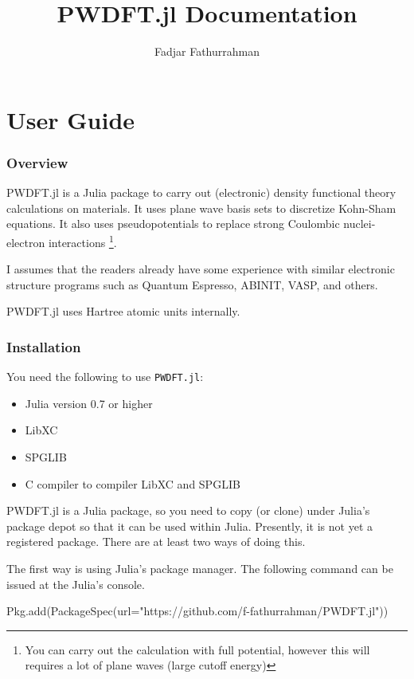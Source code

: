 \documentclass[a4paper,10pt]{paper}
\begin{document}
\title{\textsf{PWDFT.jl} Documentation}
\author{Fadjar Fathurrahman}
\maketitle

\tableofcontents

\part{User Guide}

\section{Overview}

\textsf{PWDFT.jl} is a Julia package to carry out (electronic)
density functional theory calculations on materials.
It uses plane wave basis sets to discretize Kohn-Sham equations.
It also uses pseudopotentials to replace strong Coulombic nuclei-electron
interactions \footnote{You can carry out the calculation with
full potential, however this will requires a lot of plane waves (large
cutoff energy)}.

I assumes that the readers already have some experience with similar electronic
structure programs such as Quantum Espresso, ABINIT, VASP, and others.

\textsf{PWDFT.jl} uses Hartree atomic units internally.

\section{Installation}

You need the following to use \texttt{PWDFT.jl}:
\begin{itemize}
\item Julia version 0.7 or higher
\item LibXC
\item SPGLIB
\item C compiler to compiler LibXC and SPGLIB
\end{itemize}

\textsf{PWDFT.jl} is a Julia package, so you need to copy (or clone)
under Julia's package depot so that it can be used within Julia.
Presently, it is not yet a registered package. There are at least
two ways of doing this.

The first way is using Julia's package manager. The following command
can be issued at the Julia's console.
\begin{juliacode}
Pkg.add(PackageSpec(url="https://github.com/f-fathurrahman/PWDFT.jl"))
\end{juliacode}
\end{document}
